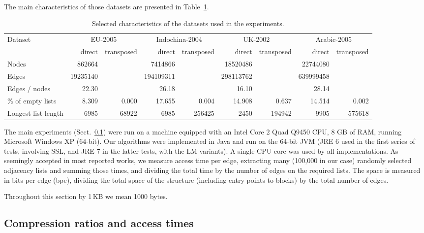 \documentclass[envcountsame]{llncs}
\begin{document}
The main characteristics of those datasets are presented in Table~\ref{table:datasets}.


\begin{table}
\centering
\begin{tabular}{lrrrrrrrr}
\hline
Dataset & \multicolumn{2}{c}{EU-2005} &  \multicolumn{2}{c}{Indochina-2004} & \multicolumn{2}{c}{UK-2002} &  \multicolumn{2}{c}{Arabic-2005} \\
\cline{2-9}
        &  direct & transposed & direct & transposed  
        &  direct & transposed & direct & transposed \\
\hline
Nodes & 862664   & & 7414866   & & 18520486  & & 22744080  & \\
Edges & 19235140 & & 194109311 & & 298113762 & & 639999458 & \\
Edges / nodes & 22.30 & & 26.18 & & 16.10 & & 28.14 & \\
\% of empty lists & 8.309 & 0.000 & 17.655 & 0.004 & 14.908 & 0.637 & 14.514 &  0.002 \\
Longest list length & 6985 & 68922 & 6985 & 256425 & 2450 & 194942 & 9905 & 575618 \\
\hline
\end{tabular}
\vspace{4mm}
\caption{Selected characteristics of the datasets used in the experiments.}
\label{table:datasets}
\end{table}

The main experiments (Sect.~\ref{sec:craat})
were run on a machine equipped with an Intel Core 2 Quad Q9450 CPU, 
8 GB of RAM, running Microsoft Windows XP (64-bit).
Our algorithms were implemented in Java and run on the 64-bit JVM 
(JRE 6 used in the first series of tests, involving SSL, 
and JRE 7 in the latter tests, with the LM variants). 
A single CPU core was used by all implementations.
As seemingly accepted in most reported works, 
we measure access time per edge, extracting many (100,000 in our case) 
randomly selected adjacency lists and summing those times, and dividing the 
total time by the number of edges on the required lists.
The space is measured in bits per edge (bpe), dividing the
total space of the structure (including entry points to blocks)
by the total number of edges.

Throughout this section by 1\,KB we mean 1000 bytes.


\subsection{Compression ratios and access times}
\label{sec:craat}
\end{document}
